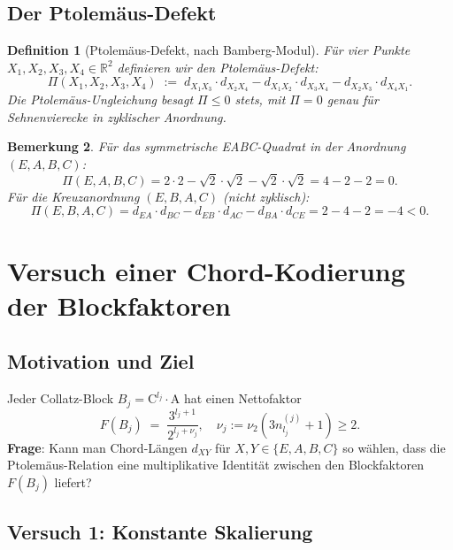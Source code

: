 \documentclass[12pt,a4paper]{article}
\newtheorem{definition}{Definition}[section]
\newtheorem{bemerkung}[definition]{Bemerkung}
\newcommand{\vii}{\nu_2}
\newcommand{\R}{\mathbb{R}}
\newcommand{\chord}[2]{d_{#1#2}}   %
\newcommand{\Ptol}{\Pi}             %
\begin{document}
\subsection{Der Ptolemäus-Defekt}

\begin{definition}[Ptolemäus-Defekt, nach Bamberg-Modul]
\label{def:defekt}
Für vier Punkte $X_1, X_2, X_3, X_4 \in \R^2$ definieren wir den
\emph{Ptolemäus-Defekt}:
\[
  \Ptol(X_1,X_2,X_3,X_4)
  \;:=\;
  \chord{X_1}{X_3}\cdot\chord{X_2}{X_4}
  - \chord{X_1}{X_2}\cdot\chord{X_3}{X_4}
  - \chord{X_2}{X_3}\cdot\chord{X_4}{X_1}.
\]
Die Ptolemäus-Ungleichung besagt $\Ptol \leq 0$ stets, mit $\Ptol = 0$
genau für Sehnenvierecke in zyklischer Anordnung.
\end{definition}

\begin{bemerkung}
Für das symmetrische EABC-Quadrat in der Anordnung $(E,A,B,C)$:
\[
  \Ptol(E,A,B,C) = 2\cdot 2 - \sqrt{2}\cdot\sqrt{2} - \sqrt{2}\cdot\sqrt{2}
  = 4 - 2 - 2 = 0.
\]
Für die Kreuzanordnung $(E,B,A,C)$ (nicht zyklisch):
\[
  \Ptol(E,B,A,C) = \chord{E}{A}\cdot\chord{B}{C} - \chord{E}{B}\cdot\chord{A}{C}
  - \chord{B}{A}\cdot\chord{C}{E}
  = 2 - 4 - 2 = -4 < 0.
\]
\end{bemerkung}

\section{Versuch einer Chord-Kodierung der Blockfaktoren}
\label{sec:kodierung}

\subsection{Motivation und Ziel}

Jeder Collatz-Block $B_j = \mathrm{C}^{l_j}\!\cdot\mathrm{A}$ hat einen
Nettofaktor
\[
  F(B_j) \;=\; \frac{3^{l_j+1}}{2^{l_j+\nu_j}},
  \quad \nu_j := \vii(3n_{l_j}^{(j)}+1) \geq 2.
\]
\textbf{Frage}: Kann man Chord-Längen $\chord{X}{Y}$ für $X, Y \in \{E,A,B,C\}$
so wählen, dass die Ptolemäus-Relation eine multiplikative Identität zwischen
den Blockfaktoren $F(B_j)$ liefert?

\subsection{Versuch 1: Konstante Skalierung}
\end{document}
